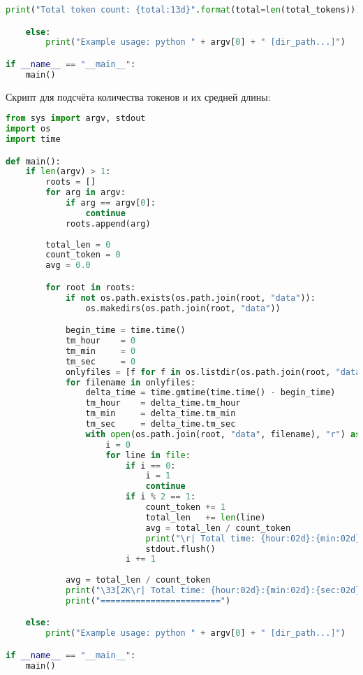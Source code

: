 \begin{lstlisting}[language=Python]
        print("Total token count: {total:13d}".format(total=len(total_tokens)))

    else:
        print("Example usage: python " + argv[0] + " [dir_path...]")

if __name__ == "__main__":
    main()
\end{lstlisting}

Скрипт для подсчёта количества токенов и их средней длины:
\begin{lstlisting}[language=Python]
from sys import argv, stdout
import os
import time

def main():
    if len(argv) > 1:
        roots = []
        for arg in argv:
            if arg == argv[0]:
                continue
            roots.append(arg)
        
        total_len = 0
        count_token = 0
        avg = 0.0

        for root in roots:
            if not os.path.exists(os.path.join(root, "data")):
                os.makedirs(os.path.join(root, "data"))

            begin_time = time.time()
            tm_hour    = 0
            tm_min     = 0
            tm_sec     = 0
            onlyfiles = [f for f in os.listdir(os.path.join(root, "data")) if os.path.isfile(os.path.join(root, "data", f))]
            for filename in onlyfiles:
                delta_time = time.gmtime(time.time() - begin_time)
                tm_hour    = delta_time.tm_hour
                tm_min     = delta_time.tm_min
                tm_sec     = delta_time.tm_sec
                with open(os.path.join(root, "data", filename), "r") as file:
                    i = 0
                    for line in file:
                        if i == 0:
                            i = 1
                            continue
                        if i % 2 == 1:
                            count_token += 1
                            total_len   += len(line)
                            avg = total_len / count_token
                            print("\r| Total time: {hour:02d}:{min:02d}:{sec:02d} | Tokens = {tokens:10d}, Avg_len  {agv_len:10.5f} | Check {path}... {line}".format(hour=tm_hour, min=tm_min, sec=tm_sec, path=os.path.join(root, filename), line=line, tokens=count_token, agv_len=avg), end="")
                            stdout.flush()
                        i += 1
            
            avg = total_len / count_token
            print("\33[2K\r| Total time: {hour:02d}:{min:02d}:{sec:02d} | Tokens = {tokens:10d}, Avg_len  {agv_len:10.5f}".format(hour=tm_hour, min=tm_min, sec=tm_sec, tokens=count_token, agv_len=avg))
            print("========================")

    else:
        print("Example usage: python " + argv[0] + " [dir_path...]")

if __name__ == "__main__":
    main()
\end{lstlisting}

\pagebreak

